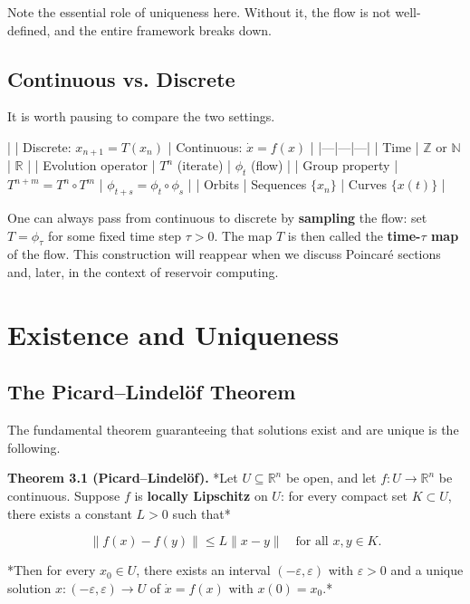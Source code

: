 Note the essential role of uniqueness here. Without it, the flow is not well-defined, and the entire framework breaks down.

\subsection{Continuous vs. Discrete}\label{sec:3.1.3}

It is worth pausing to compare the two settings.

| | Discrete: $x_{n+1} = T(x_n)$ | Continuous: $\dot{x} = f(x)$ |
|---|---|---|
| Time | $\mathbb{Z}$ or $\mathbb{N}$ | $\mathbb{R}$ |
| Evolution operator | $T^n$ (iterate) | $\phi_t$ (flow) |
| Group property | $T^{n+m} = T^n \circ T^m$ | $\phi_{t+s} = \phi_t \circ \phi_s$ |
| Orbits | Sequences $\{x_n\}$ | Curves $\{x(t)\}$ |

One can always pass from continuous to discrete by \textbf{sampling} the flow: set $T = \phi_\tau$ for some fixed time step $\tau > 0$. The map $T$ is then called the \textbf{time-$\tau$ map} of the flow. This construction will reappear when we discuss Poincar\'e sections and, later, in the context of reservoir computing.


\bigskip


\section{Existence and Uniqueness}\label{sec:3.2}

\subsection{The Picard--Lindel\"of Theorem}\label{sec:3.2.1}

The fundamental theorem guaranteeing that solutions exist and are unique is the following.

\textbf{Theorem 3.1 (Picard--Lindel\"of).} *Let $U \subseteq \mathbb{R}^n$ be open, and let $f: U \to \mathbb{R}^n$ be continuous. Suppose $f$ is \textbf{locally Lipschitz} on $U$: for every compact set $K \subset U$, there exists a constant $L > 0$ such that*

\[
\|f(x) - f(y)\| \leq L\|x - y\| \quad \text{for all } x, y \in K.
\]

*Then for every $x_0 \in U$, there exists an interval $(-\varepsilon, \varepsilon)$ with $\varepsilon > 0$ and a unique solution $x: (-\varepsilon, \varepsilon) \to U$ of $\dot{x} = f(x)$ with $x(0) = x_0$.*

